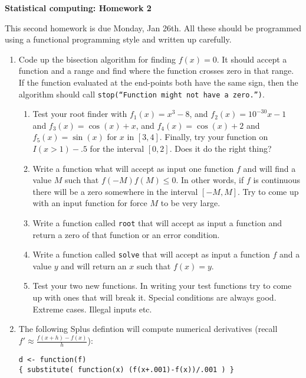 \renewcommand{\baselinestretch}{1.2}

\centerline{\bf Statistical computing: Homework 2}

\vspace{2ex}

This second homework is due Monday, Jan 26th.  All these should be
programmed using a functional programming style and written up carefully.

\begin{enumerate}
\item Code up the bisection algorithm for finding $f(x) = 0$.  It
should accept a function and a range and find where the function
crosses zero in that range.  If the function evaluated at the
end-points both have the same sign, then the algorithm should call
{\tt stop(``Function might not have a zero.'')}.
\begin{enumerate}
\item Test your root finder with $f_1(x) = x^3 - 8$, and $f_2(x) =
10^{-30}x - 1$ and $f_3(x) = \cos(x) + x$, and $f_4(x) = \cos(x) + 2$
and $f_5(x) = \sin(x)$ for $x$ in $[3,4]$.  Finally, try your function
on $I(x>1) - .5$ for the interval $[0,2]$.  Does it do the right thing?
\item Write a function what will accept as input one function $f$ and will
find a value $M$ such that $f(-M)f(M) \le 0$.  In other words, if $f$
is continuous there will be a zero somewhere in the interval $[-M,M]$.
Try to come up with an input function for force $M$ to be very large.
\item Write a function called {\tt root} that will accept as input a
function and return a zero of that function or an error condition.
\item Write a function called {\tt solve} that will accept as input a
function $f$ and a value $y$ and will return an $x$ such that $f(x) = y$.
\item Test your two new functions.  In writing your test functions try
to come up with ones that will break it.  Special conditions are
always good.  Extreme cases.  Illegal inputs etc.
\end{enumerate}

\item The following Splus defintion will compute numerical
derivatives (recall $f' \approx \frac{f(x+h) - f(x)}{h}$):
 
{\tt d <- function(f) \\
\{ substitute( function(x) (f(x+.001)-f(x))/.001 ) \}
}


\end{enumerate}
